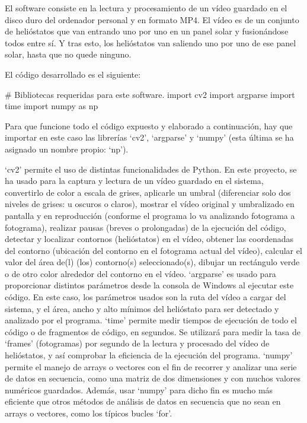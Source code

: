 \documentclass[12pt]{article}
\begin{document}
El software consiste en la lectura y procesamiento de un vídeo guardado en el disco duro del ordenador personal y en formato MP4. El vídeo es de un conjunto de helióstatos que van entrando uno por uno en un panel solar y fusionándose todos entre sí. Y tras esto, los helióstatos van saliendo uno por uno de ese panel solar, hasta que no quede ninguno.

El código desarrollado es el siguiente:

\# Bibliotecas requeridas para este software.
import cv2
import argparse
import time
import numpy as np

Para que funcione todo el código expuesto y elaborado a continuación, hay que importar en este caso las librerías ‘cv2’, ‘argparse’ y ‘numpy’ (esta última se ha asignado un nombre propio: ‘np’).

‘cv2’ permite el uso de distintas funcionalidades de Python. En este proyecto, se ha usado para la captura y lectura de un vídeo guardado en el sistema, convertirlo de color a escala de grises, aplicarle un umbral (diferenciar solo dos niveles de grises: u oscuros o claros), mostrar el vídeo original y umbralizado en pantalla y en reproducción (conforme el programa lo va analizando fotograma a fotograma), realizar pausas (breves o prolongadas) de la ejecución del código, detectar y localizar contornos (helióstatos) en el vídeo, obtener las coordenadas del contorno (ubicación del contorno en el fotograma actual del vídeo), calcular el valor del área de(l) (los) contorno(s) seleccionado(s), dibujar un rectángulo verde o de otro color alrededor del contorno en el vídeo.
‘argparse’ es usado para proporcionar distintos parámetros desde la consola de Windows al ejecutar este código. En este caso, los parámetros usados son la ruta del vídeo a cargar del sistema, y el área, ancho y alto mínimos del helióstato para ser detectado y analizado por el programa.
‘time’ permite medir tiempos de ejecución de todo el código o de fragmentos de código, en segundos. Se utilizará para medir la tasa de ‘frames’ (fotogramas) por segundo de la lectura y procesado del vídeo de helióstatos, y así comprobar la eficiencia de la ejecución del programa.
‘numpy’ permite el manejo de arrays o vectores con el fin de recorrer y analizar una serie de datos en secuencia, como una matriz de dos dimensiones y con muchos valores numéricos guardados. Además, usar ‘numpy’ para dicho fin es mucho más eficiente que otros métodos de análisis de datos en secuencia que no sean en arrays o vectores, como los típicos bucles ‘for’.
\end{document}
